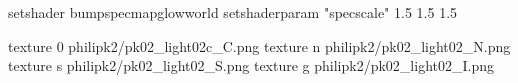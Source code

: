 setshader bumpspecmapglowworld
setshaderparam "specscale" 1.5 1.5 1.5


texture 0 philipk2/pk02_light02c_C.png
texture n philipk2/pk02_light02_N.png
texture s philipk2/pk02_light02_S.png
texture g philipk2/pk02_light02_I.png


